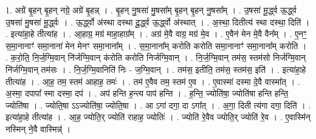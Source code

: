 \documentclass[17pt]{extarticle}
\begin{document}
1. अग्रे॑ बृ॒हन् बृ॒हन् नग्रे॒ अग्रे॑ बृ॒हन्न् । . बृ॒हन् नु॒षसा॑ मु॒षसा᳚म् बृ॒हन् बृ॒हन् नु॒षसा᳚म् । . उ॒षसा॑ मू॒र्द्ध्व ऊ॒र्द्ध्व उ॒षसा॑ मु॒षसा॑ मू॒र्द्ध्वः । . ऊ॒र्द्ध्वो अ॑स्था दस्था दू॒र्द्ध्व ऊ॒र्द्ध्वो अ॑स्थात् । . अ॒स्था॒ दितीत्य॑ स्था दस्था॒ दिति॑ । . इत्या॑हा॒हे तीत्या॑ह । . आ॒हाग्र॒ मग्र॑ माहा॒हाग्र᳚म् । . अग्र॑ मे॒वै वाग्र॒ मग्र॑ मे॒व । . ए॒वैन॑ मेन मे॒वै वैन᳚म् । . ए॒नꣳ॒॒ स॒मा॒नानाꣳ॑ समा॒नाना॑ मेन मेनꣳ समा॒नाना᳚म् । . स॒मा॒नाना᳚म् करोति करोति समा॒नानाꣳ॑ समा॒नाना᳚म् करोति । . क॒रो॒ति॒ नि॒र्ज॒ग्मि॒वान् नि॑र्जग्मि॒वान् क॑रोति करोति निर्जग्मि॒वान् । . नि॒र्ज॒ग्मि॒वान् तम॑स॒ स्तम॑सो निर्जग्मि॒वान् नि॑र्जग्मि॒वान् तम॑सः । . नि॒र्ज॒ग्मि॒वानिति॑ निः - ज॒ग्मि॒वान् । . तम॑स॒ इतीति॒ तम॑स॒ स्तम॑स॒ इति॑ । . इत्या॑हा॒हे तीत्या॑ह । . आ॒ह॒ तम॒ स्तम॑ आहाह॒ तमः॑ । . तम॑ ए॒वैव तम॒ स्तम॑ ए॒व । . ए॒वास्मा॑ दस्मा दे॒वै वास्मा᳚त् । . अ॒स्मा॒ दपापा᳚ स्मा दस्मा॒ दप॑ । . अप॑ हन्ति ह॒न्त्य पाप॑ हन्ति । . ह॒न्ति॒ ज्योति॑षा॒ ज्योति॑षा हन्ति हन्ति॒ ज्योति॑षा । . ज्योति॒षा ऽऽज्योति॑षा॒ ज्योति॒षा । . आ ऽगा॑ दगा॒ दा ऽगा᳚त् । . अ॒गा॒ दिती त्य॑गा दगा॒ दिति॑ । . इत्या॑हा॒हे तीत्या॑ह । . आ॒ह॒ ज्योति॒र् ज्योति॑ राहाह॒ ज्योतिः॑ । . ज्योति॑ रे॒वैव ज्योति॒र् ज्योति॑ रे॒व । . ए॒वास्मि॑न् नस्मिन् ने॒वै वास्मिन्न्॑ । \newline
\end{document}
